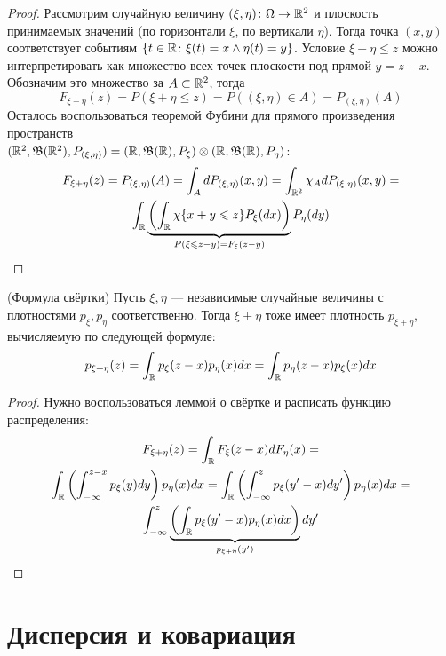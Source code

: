 \begin{proof}
	Рассмотрим случайную величину $(\xi, \eta) \colon \Omega \to \mathbb{R}^2$ и плоскость принимаемых значений (по горизонтали $\xi$, по вертикали $\eta$). Тогда точка $(x, y)$ соответствует событиям $\{t \in \mathbb{R} \colon \xi(t) = x \wedge \eta(t) = y\}$. Условие $\xi + \eta \le z$ можно интерпретировать как множество всех точек плоскости под прямой $y = z - x$. Обозначим это множество за $A \subset \mathbb{R}^2$, тогда
	\[
		F_{\xi + \eta}(z) = P(\xi + \eta \le z) = P((\xi, \eta) \in A) = P_{(\xi, \eta)}(A)
	\]
	Осталось воспользоваться теоремой Фубини для прямого произведения пространств \\ $(\mathbb{R}^2, \mathfrak{B}(\mathbb{R}^2), P_{(\xi, \eta)}) = (\mathbb{R}, \mathfrak{B}(\mathbb{R}), P_\xi) \otimes (\mathbb{R}, \mathfrak{B}(\mathbb{R}), P_\eta)$:
	\begin{multline*}
		F_{\xi + \eta}(z) = P_{(\xi, \eta)}(A) = \int_A dP_{(\xi, \eta)}(x, y) = \int_{\mathbb{R}^2} \chi_A dP_{(\xi, \eta)}(x, y) =
		\\
		\int_{\mathbb{R}} \underbrace{\left(\int_{\mathbb{R}} \chi\{x + y \leqslant z\} P_\xi(dx)\right)}_{P(\xi \leqslant z - y) = F_\xi(z - y)} P_\eta(dy)
	\end{multline*}
\end{proof}

\begin{corollary} (Формула свёртки)
	Пусть $\xi, \eta$ --- независимые случайные величины с плотностями $p_\xi, p_\eta$ соответственно. Тогда $\xi + \eta$ тоже имеет плотность $p_{\xi + \eta}$, вычисляемую по следующей формуле:
	\[
		p_{\xi + \eta}(z) = \int_{\mathbb{R}} p_\xi(z - x)p_\eta(x)dx = \int_{\mathbb{R}} p_\eta(z - x)p_\xi(x)dx
	\]
\end{corollary}

\begin{proof}
	Нужно воспользоваться леммой о свёртке и расписать функцию распределения:
	\begin{multline*}
		F_{\xi + \eta}(z) = \int_{\mathbb{R}} F_\xi(z - x)dF_\eta(x) =
		\\
		\int_{\mathbb{R}} \left(\int_{-\infty}^{z - x} p_\xi(y)dy\right) p_\eta(x)dx = \int_{\mathbb{R}} \left(\int_{-\infty}^z p_\xi(y' - x)dy'\right)p_\eta(x)dx =
		\\
		\int_{-\infty}^z \underbrace{\left(\int_{\mathbb{R}} p_\xi(y' - x)p_\eta(x)dx\right)}_{p_{\xi + \eta}(y')}dy'
	\end{multline*}
\end{proof}

\section{Дисперсия и ковариация}

